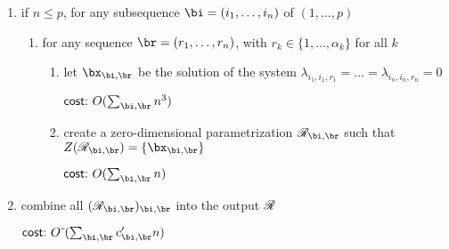 \documentclass[12pt]{article}
\begin{document}
\begin{algorithm}[!t]
\begin{enumerate}
\item if $n \le p$, for any subsequence $\bi = (i_1, \ldots, i_n)$ of $(1, \ldots, p)$
  \begin{enumerate}
  \item for any sequence $\br = (r_1, \ldots, r_n)$, with $r_k \in \{1,\dots,\alpha_k\}$ for all $k$
    \begin{enumerate}
    \item let $\bx_{\bi,\br}$ be the solution of the system $\lambda_{i_1,i_1,r_1}=\dots=\lambda_{i_n,i_n,r_n}=0$

\hfill      $\text{\sf{cost:~}} O(\sum_{\bi,\br}n^3)$
    \item create a zero-dimensional parametrization $\scrR_{\bi,\br}$ such that $Z(\scrR_{\bi,\br})=\{\bx_{\bi,\br}\}$

\hfill      $\text{\sf{cost:~}} O(\sum_{\bi,\br}n)$
  \end{enumerate}
\end{enumerate}
\item combine all $(\scrR_{\bi,\br})_{\bi,\br}$ into the output $\mathscr{R}$

\hfill  $\text{\sf{cost:~}} \softO(\sum_{\bi,\br}  c'_{\bi,\br} n)$
\end{enumerate}
\label{Row}
\end{algorithm}
\end{document}

